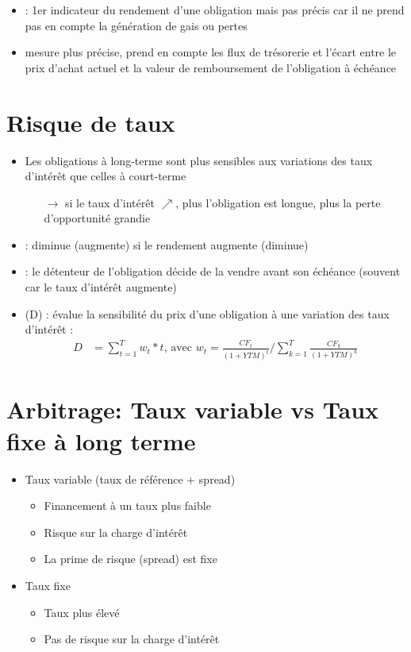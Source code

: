 \begin{itemize}
    \item {} : 1er indicateur du rendement d'une obligation mais pas précis car il ne prend pas en compte la génération de gais ou pertes
    \item {} mesure plus précise, prend en compte les flux de trésorerie et l'écart entre le prix d'achat actuel et la valeur de remboursement de l'obligation à échéance
\end{itemize}

\section{Risque de taux}

\begin{itemize}
    \item Les obligations à long-terme sont plus sensibles aux variations des taux d'intérêt que celles à court-terme
    \begin{itemize}
        \item[$\rightarrow$] si le taux d'intérêt $\nearrow$, plus l'obligation est longue, plus la perte d'opportunité grandie
    \end{itemize}
    \item {} : diminue (augmente) si le rendement augmente (diminue)
    \item {} : le détenteur de l'obligation décide de la vendre avant son échéance (souvent car le taux d'intérêt augmente)
    \item {} (D) : évalue la sensibilité du prix d'une obligation à une variation des taux d'intérêt :
    \begin{align*}
        D &= \sum_{t=1}^T w_t * t \text{, avec } w_t = \frac{CF_t}{(1+YTM)^t} / \sum_{k=1}^T \frac{CF_k}{(1 + YTM)^k}
    \end{align*}
\end{itemize}

\section{Arbitrage: Taux variable vs Taux fixe à long terme}

\begin{itemize}
    \item Taux variable (taux de référence + spread)
    \begin{itemize}
        \item Financement à un taux plus faible
        \item Risque sur la charge d'intérêt
        \item La prime de risque (spread) est fixe
    \end{itemize}
    \item Taux fixe
    \begin{itemize}
        \item Taux plus élevé
        \item Pas de risque sur la charge d'intérêt
    \end{itemize}
\end{itemize}

